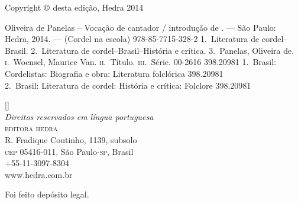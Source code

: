 
\clearpage

\begingroup
\centering
\footnotesize

Copyright $\copyright$ desta edição, Hedra 2014\\\medskip

%
%
%
%
%

%
{Oliveira de Panelas -- Vocação de cantador / introdução de \introdutor. --- São Paulo: Hedra, 2014. --- (Cordel na escola)}
{978-85-7715-328-2}%
{1.~Literatura de cordel--Brasil. 2.~Literatura de
cordel--Brasil--História e crítica. 3.~Panelas, Oliveira de.
\textsc{i}.~Woensel, Maurice Van. \textsc{ii}.~Título.
\textsc{iii}.~Série.}%
{00-2616}%
{398.20981}%
{1.~Brasil: Cordelistas: Biografia e obra: Literatura folclórica 398.20981\\
2.~Brasil: Literatura de cordel: História e crítica: Folclore 398.20981}

\vfill

[\the\year]\\
\textit{Direitos reservados em língua portuguesa}\\
\textsc{editora hedra}\\
R. Fradique Coutinho, 1139, subsolo\\
\textsc{cep} 05416-011,  São Paulo-\textsc{sp}, Brasil\\
+55-11-3097-8304\\ 
www.hedra.com.br\\\smallskip

Foi feito depósito legal.

\par
\endgroup
\clearpage
